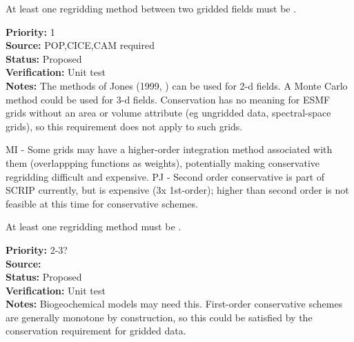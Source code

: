 
At least one regridding method between two gridded fields must be
.

\begin{reqlist}
{\bf Priority:} 1 \\
{\bf Source:} POP,CICE,CAM required \\
{\bf Status:} Proposed \\
{\bf Verification:} Unit test \\
{\bf Notes:} The methods of Jones (1999, \cite{Jones1999}) can be used
             for 2-d fields. A Monte Carlo method could be used for
             3-d fields.  Conservation has no meaning
             for ESMF grids without an area or volume attribute
             (eg ungridded data, spectral-space grids), so this
             requirement does not apply to such grids.

             MI - Some grids may have a higher-order integration method
             associated with them (overlappping functions as weights),
             potentially making conservative regridding difficult and expensive.
             PJ - Second order conservative is part of SCRIP currently,
             but is expensive (3x 1st-order); higher than second order is not 
             feasible at this time for conservative schemes.
             \\
\end{reqlist}


At least one regridding method must be .

\begin{reqlist}
{\bf Priority:} 2-3? \\
{\bf Source:}  \\
{\bf Status:} Proposed \\
{\bf Verification:} Unit test \\
{\bf Notes:} Biogeochemical models may need this.  First-order
             conservative schemes are generally monotone by
             construction, so this could be satisfied by the
             conservation requirement for gridded data.
\end{reqlist}



